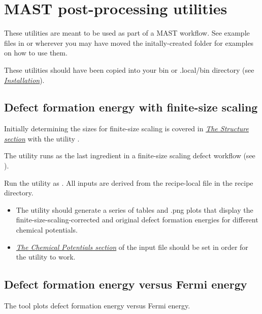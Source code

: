 \documentclass[letterpaper,10pt,english]{sphinxmanual}
\begin{document}
\chapter{MAST post-processing utilities}
\label{6_0_postprocessingtools::doc}\label{6_0_postprocessingtools:mast-post-processing-utilities}
These utilities are meant to be used as part of a MAST workflow.
See example files in  or wherever you may have moved the initally-created  folder for examples on how to use them.

These utilities should have been copied into your bin or .local/bin directory (see {\hyperref[1_0_installation::doc]{\emph{Installation}}}).


\section{Defect formation energy with finite-size scaling}
\label{6_0_postprocessingtools:defect-formation-energy-with-finite-size-scaling}
Initially determining the sizes for finite-size scaling is covered in {\hyperref[3_1_1_structure::doc]{\emph{The Structure section}}} with the utility .

The  utility runs as the last ingredient in a finite-size scaling defect workflow (see ).

Run the utility as . All inputs are derived from the recipe-local  file in the recipe directory.
\begin{itemize}
\item {} 
The utility should generate a series of tables and .png plots that display the finite-size-scaling-corrected and original defect formation energies for different chemical potentials.

\item {} 
{\hyperref[3_1_7_chemicalpotentials::doc]{\emph{The Chemical Potentials section}}} of the input file should be set in order for the utility to work.

\end{itemize}


\section{Defect formation energy versus Fermi energy}
\label{6_0_postprocessingtools:defect-formation-energy-versus-fermi-energy}
The  tool plots defect formation energy versus Fermi energy.
\end{document}
